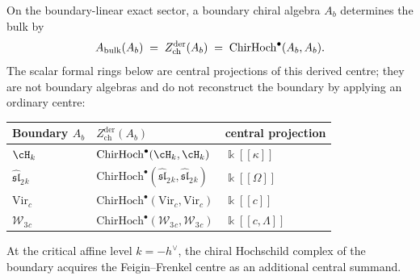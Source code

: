 \begin{construction}
On the boundary-linear exact sector, a boundary chiral algebra $A_b$
determines the bulk by
\[
A_{\mathrm{bulk}}(A_b)
\;=\;
Z^{\mathrm{der}}_{\mathrm{ch}}(A_b)
\;=\;
\mathrm{ChirHoch}^\bullet(A_b,A_b).
\]
The scalar formal rings below are central projections of this derived
centre; they are not boundary algebras and do not reconstruct the
boundary by applying an ordinary centre:
\begin{center}
\renewcommand{\arraystretch}{1.15}
\begin{tabular}{lll}
\textbf{Boundary $A_b$} & \textbf{$Z^{\mathrm{der}}_{\mathrm{ch}}(A_b)$} & \textbf{central projection} \\
\hline
$\cH_k$ & $\mathrm{ChirHoch}^\bullet(\cH_k,\cH_k)$ & $\Bbbk[[\kappa]]$ \\
$\widehat{\mathfrak{sl}}_2{}_k$ & $\mathrm{ChirHoch}^\bullet(\widehat{\mathfrak{sl}}_2{}_k,\widehat{\mathfrak{sl}}_2{}_k)$ & $\Bbbk[[\Omega]]$ \\
$\mathrm{Vir}_c$
 & $\mathrm{ChirHoch}^\bullet(\mathrm{Vir}_c,\mathrm{Vir}_c)$
 & $\Bbbk[[c]]$ \\
$\mathcal W_3{}_c$
 & $\mathrm{ChirHoch}^\bullet(\mathcal W_3{}_c,\mathcal W_3{}_c)$
 & $\Bbbk[[c,\Lambda]]$
\end{tabular}
\end{center}
At the critical affine level $k=-h^\vee$, the chiral Hochschild
complex of the boundary acquires the Feigin--Frenkel centre as an
additional central summand.
\end{construction}

